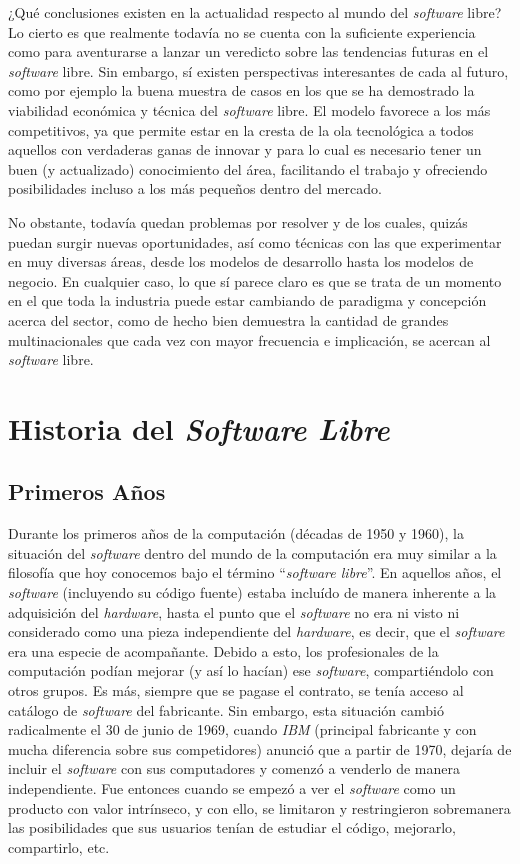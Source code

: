 ¿Qué conclusiones existen en la actualidad respecto al mundo del
\textit{software} libre? Lo cierto es que realmente todavía no se cuenta con la
suficiente experiencia como para aventurarse a lanzar un veredicto sobre las
tendencias futuras en el \textit{software} libre. Sin embargo, sí existen
perspectivas interesantes de cada al futuro, como por ejemplo la buena muestra
de casos en los que se ha demostrado la viabilidad económica y técnica del
\textit{software} libre. El modelo favorece a los más competitivos, ya que
permite estar en la cresta de la ola tecnológica a todos aquellos con verdaderas
ganas de innovar y para lo cual es necesario tener un buen (y actualizado)
conocimiento del área, facilitando el trabajo y ofreciendo posibilidades incluso
a los más pequeños dentro del mercado.

No obstante, todavía quedan problemas por resolver y de los cuales, quizás
puedan surgir nuevas oportunidades, así como técnicas con las que experimentar
en muy diversas áreas, desde los modelos de desarrollo hasta los modelos de
negocio. En cualquier caso, lo que sí parece claro es que se trata de un momento
en el que toda la industria puede estar cambiando de paradigma y concepción
acerca del sector, como de hecho bien demuestra la cantidad de grandes
multinacionales que cada vez con mayor frecuencia e implicación, se acercan al
\textit{software} libre.

\section{Historia del \textit{Software Libre}}

\subsection{Primeros Años}

Durante los primeros años de la computación (décadas de 1950 y 1960), la
situación del \textit{software} dentro del mundo de la computación era muy
similar a la filosofía que hoy conocemos bajo el término ``\textit{software
libre}''. En aquellos años, el \textit{software} (incluyendo su código fuente)
estaba incluído de manera inherente a la adquisición del \textit{hardware},
hasta el punto que el \textit{software} no era ni visto ni considerado como una
pieza independiente del \textit{hardware}, es decir, que el \textit{software}
era una especie de acompañante. Debido a esto, los profesionales de la
computación podían mejorar (y así lo hacían) ese \textit{software},
compartiéndolo con otros grupos. Es más, siempre que se pagase el contrato, se
tenía acceso al catálogo de \textit{software} del fabricante. Sin embargo, esta
situación cambió radicalmente el 30 de junio de 1969, cuando \textit{IBM}
(principal fabricante y con mucha diferencia sobre sus competidores) anunció que
a partir de 1970, dejaría de incluir el \textit{software} con sus computadores y
comenzó a venderlo de manera independiente. Fue entonces cuando se empezó a ver
el \textit{software} como un producto con valor intrínseco, y con ello, se
limitaron y restringieron sobremanera las posibilidades que sus usuarios tenían
de estudiar el código, mejorarlo, compartirlo, etc.

